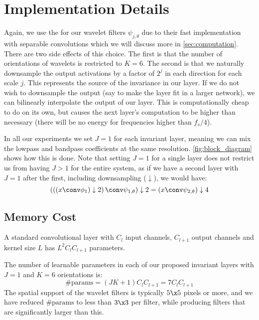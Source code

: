 \section{Implementation Details}\label{sec:implementation}
Again, we use the \DTCWT \cite{selesnick_dual-tree_2005} for our wavelet filters
$\psi_{j, \theta}$ due to their fast implementation with separable convolutions
which we will discuss more in \autoref{sec:computation}.  There are two side
effects of this choice. The first is that the number of orientations of wavelets
is restricted to $K=6$. The second is that we naturally downsample the output
activations by a factor of $2^j$ in each direction for each scale $j$. This represents the
source of the invariance in our layer. If we do not wish to downsample the
output (say to make the layer fit in a larger network), we can bilinearly
interpolate the output of our layer. This is computationally cheap to do on its
own, but causes the next layer's computation to be higher than necessary (there
will be no energy for frequencies higher than $f_s/4$).

In all our experiments we set $J=1$ for each invariant layer,
meaning we can mix the lowpass and bandpass coefficients at the same resolution.
\autoref{fig:block_diagram} shows how this is done. Note that setting $J=1$ for
a single layer does not restrict us from having $J>1$ for the entire system, as
if we have a second layer with $J=1$ after the first, including downsampling
($\downarrow$), we would have:
%
\begin{equation}
  \left(\left(\left(x \conv \phi_1\right) \downarrow 2\right) \conv \psi_{1, \theta}\right) \downarrow 2 = \left(x \conv \psi_{2, \theta}\right) \downarrow 4
\end{equation}

\subsection{Memory Cost}\label{sec:memory}
A standard convolutional layer with $C_l$ input channels, $C_{l+1}$ output channels
and kernel size $L$ has $L^2C_{l}C_{l+1}$ parameters. 

The number of learnable parameters in each of our proposed invariant layers with
$J=1$ and $K=6$ orientations is:
%
\begin{equation}
  \text{\#params} = (JK+1)C_{l}C_{l+1} = 7C_{l}C_{l+1}
\end{equation} 
%
The spatial support of the wavelet filters is typically $5\x 5$ pixels or more,
and we have reduced $\text{\#params}$ to less than $3\x3$ per filter, while
producing filters that are significantly larger than this.

